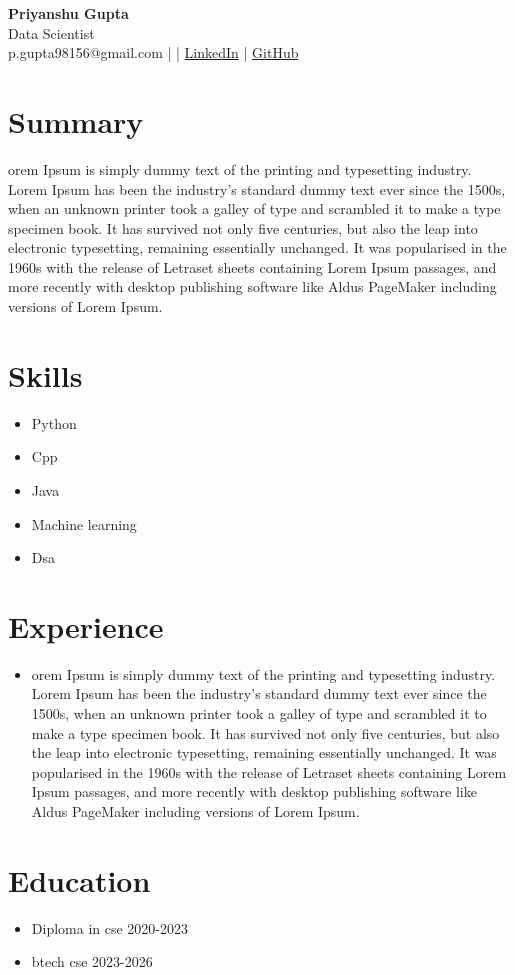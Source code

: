 \documentclass[12pt]{article}
\begin{document}
\begin{center}
    \Huge \textbf{Priyanshu Gupta} \\
    \vspace{5pt}
    \large Data Scientist  \\
    \vspace{5pt}
    \normalsize p.gupta98156@gmail.com \; |  \; | \; 
    \href{abc@linkedin}{LinkedIn} \; | \; \href{abc@github.com}{GitHub} \\
\end{center}

\section*{Summary}
orem Ipsum is simply dummy text of the printing and typesetting industry. Lorem Ipsum has been the industry's standard dummy text ever since the 1500s, when an unknown printer took a galley of type and scrambled it to make a type specimen book. It has survived not only five centuries, but also the leap into electronic typesetting, remaining essentially unchanged. It was popularised in the 1960s with the release of Letraset sheets containing Lorem Ipsum passages, and more recently with desktop publishing software like Aldus PageMaker including versions of Lorem Ipsum.

\section*{Skills}
\begin{itemize}[leftmargin=*]
    \item Python
\item Cpp
\item Java
\item Machine learning
\item Dsa

\end{itemize}

\section*{Experience}
\begin{itemize}[leftmargin=*]
    \item orem Ipsum is simply dummy text of the printing and typesetting industry. Lorem Ipsum has been the industry's standard dummy text ever since the 1500s, when an unknown printer took a galley of type and scrambled it to make a type specimen book. It has survived not only five centuries, but also the leap into electronic typesetting, remaining essentially unchanged. It was popularised in the 1960s with the release of Letraset sheets containing Lorem Ipsum passages, and more recently with desktop publishing software like Aldus PageMaker including versions of Lorem Ipsum.

\end{itemize}

\section*{Education}
\begin{itemize}[leftmargin=*]
    \item Diploma in cse 2020-2023
\item btech cse 2023-2026

\end{itemize}
\end{document}
